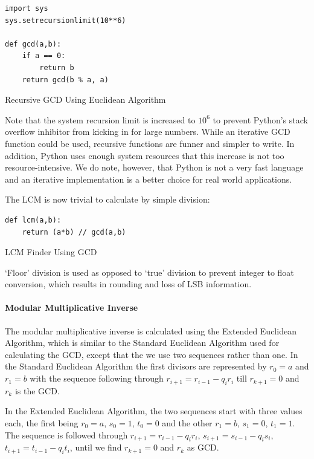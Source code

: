 \documentclass[titlepage]{article}
\newenvironment{longlisting}{\captionsetup{type=listing}}{}
\begin{document}
\begin{longlisting}
\begin{verbatim}
import sys
sys.setrecursionlimit(10**6)

def gcd(a,b):
    if a == 0:
        return b
    return gcd(b % a, a)
\end{verbatim}
\caption{Recursive GCD Using Euclidean Algorithm}
\end{longlisting}
Note that the system recursion limit is increased to $10^6$ to prevent Python's stack overflow
inhibitor from kicking in for large numbers. While an iterative GCD function could be used,
recursive functions are funner and simpler to write. In addition, Python uses enough system
resources that this increase is not too resource-intensive. We do note, however, that Python is not
a very fast language and an iterative implementation is a better choice for real world
applications.

The LCM is now trivial to calculate by simple division:

\begin{longlisting}
\begin{verbatim}
def lcm(a,b):
    return (a*b) // gcd(a,b)
\end{verbatim}
\caption{LCM Finder Using GCD}
\end{longlisting}
`Floor' division is used as opposed to `true' division to prevent integer to float conversion, which
results in rounding and loss of LSB information.

\paragraph{Modular Multiplicative Inverse}
The modular multiplicative inverse is calculated using the Extended Euclidean Algorithm, which is
similar to the Standard Euclidean Algorithm used for calculating the GCD, except that the we use two
sequences rather than one. In the Standard Euclidean Algorithm the first divisors are represented
by $r_0 = a$ and $r_1 = b$ with the sequence following through $r_{i+1}=r_{i-1}-q_i r_i$ till
$r_{k+1} = 0$ and $r_k$ is the GCD.

In the Extended Euclidean Algorithm, the two sequences start with three values each, the first being
$r_0 = a$, $s_0 = 1$, $t_0 = 0$ and the other $r_1= b$, $s_1=0$, $t_1 = 1$. The sequence is followed
through $r_{i+1}=r_{i-1}-q_i r_i$, $s_{i+1}=s_{i-1}-q_i s_i$, $t_{i+1}=t_{i-1}-q_i t_i$, until we
find $r_{k+1} = 0$ and $r_k$ as GCD.
\end{document}
